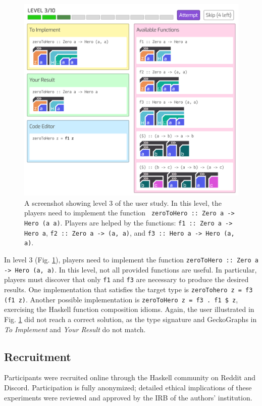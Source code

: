 \documentclass[preprint,12pt]{elsarticle}
\begin{document}
\begin{figure}[!h]
  \includegraphics[width=\linewidth]{figures/Level3}
  \caption{\label{fig:level3} A screenshot showing level 3 of the user study.  In this level, the players need to implement the function \texttt{ zeroToHero :: Zero a -> Hero (a a)}. Players are helped by the functions: {\tt f1 :: Zero a -> Hero a}, {\tt f2 :: Zero a -> (a, a)}, and {\tt f3 :: Hero a -> Hero (a, a)}.}
\end{figure}


In level 3 (Fig. \ref{fig:level3}),  players need to implement the function {\tt zeroToHero :: Zero a -> Hero (a, a)}.  In this level, not all provided functions are useful. In particular,  players must discover that only \texttt{f1} and \texttt{f3} are necessary to produce the desired results. One implementation that satisfies the target type is \texttt{zeroTohero z = f3 (f1 z)}. Another possible implementation is {\tt zeroToHero z = f3 . f1 \$ z}, exercising the Haskell function composition idioms. Again, the user illustrated in Fig. \ref{fig:level3} did not reach a correct solution, as the type signature and GeckoGraphs in {\it To Implement} and {\it Your Result} do not match.


\subsection{Recruitment}
Participants were recruited online through the Haskell community on Reddit and Discord. Participation is fully anonymized; detailed ethical implications of these experiments were reviewed and approved by the IRB of the authors' institution.
\end{document}
